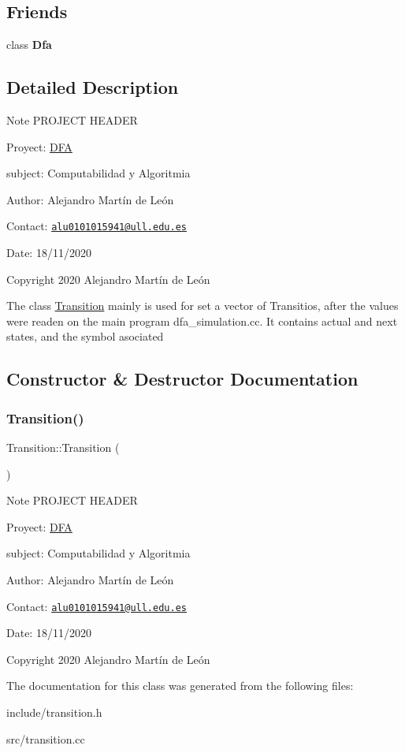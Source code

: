 \subsection*{Friends}
\begin{DoxyCompactItemize}
\item 
\mbox{\label{classTransition_a21ab7f6ff9e8704242e18ecfde24a901}} 
class {\bfseries Dfa}
\end{DoxyCompactItemize}


\subsection{Detailed Description}
\begin{DoxyNote}{Note}
P\+R\+O\+J\+E\+CT H\+E\+A\+D\+ER 

Proyect\+: \hyperlink{classDFA}{D\+FA} 

subject\+: Computabilidad y Algoritmia 

Author\+: Alejandro Martín de León 

Contact\+: \href{mailto:alu0101015941@ull.edu.es}{\tt alu0101015941@ull.\+edu.\+es} 

Date\+: 18/11/2020 

Copyright 2020 Alejandro Martín de León
\end{DoxyNote}
The class \hyperlink{classTransition}{Transition} mainly is used for set a vector of Transitios, after the values were readen on the main program dfa\+\_\+simulation.\+cc. It contains actual and next states, and the symbol asociated 

\subsection{Constructor \& Destructor Documentation}
\mbox{\label{classTransition_a73b44b2338b11807f77b620a3e810f92}} 
\subsubsection{\texorpdfstring{Transition()}{Transition()}}
{\footnotesize\ttfamily Transition\+::\+Transition (\begin{DoxyParamCaption}{ }\end{DoxyParamCaption})}

\begin{DoxyNote}{Note}
P\+R\+O\+J\+E\+CT H\+E\+A\+D\+ER 

Proyect\+: \hyperlink{classDFA}{D\+FA} 

subject\+: Computabilidad y Algoritmia 

Author\+: Alejandro Martín de León 

Contact\+: \href{mailto:alu0101015941@ull.edu.es}{\tt alu0101015941@ull.\+edu.\+es} 

Date\+: 18/11/2020 

Copyright 2020 Alejandro Martín de León 
\end{DoxyNote}


The documentation for this class was generated from the following files\+:\begin{DoxyCompactItemize}
\item 
include/transition.\+h\item 
src/transition.\+cc\end{DoxyCompactItemize}
